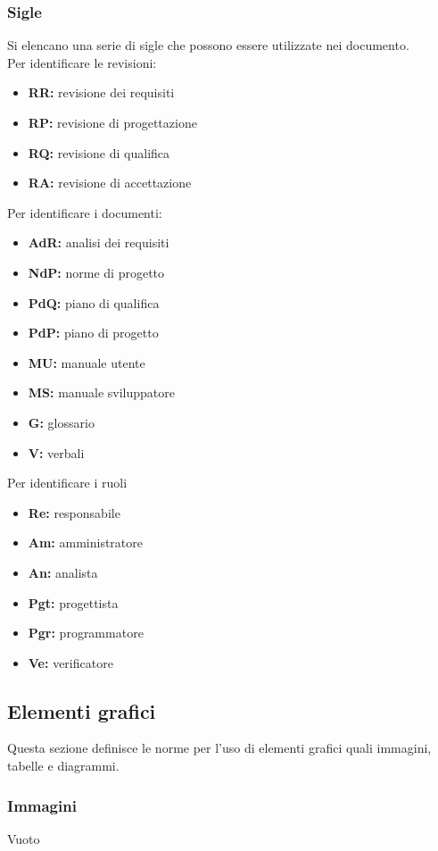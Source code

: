 \subsubsection{Sigle}
Si elencano una serie di sigle che possono essere utilizzate nei documento. 
\\
Per identificare le revisioni:
\begin{itemize}
\item \textbf{RR:} revisione dei requisiti
	\item \textbf{RP:} revisione di progettazione
	 	\item \textbf{RQ:} revisione di qualifica
			\item \textbf{RA:} revisione di accettazione
\end{itemize} 
Per identificare i documenti:
\begin{itemize}
\item \textbf{AdR:} analisi dei requisiti
	\item \textbf{NdP:} norme di progetto
		\item \textbf{PdQ:} piano di qualifica
			\item \textbf{PdP:} piano di progetto
				\item \textbf{MU:} manuale utente
					\item \textbf{MS:} manuale sviluppatore			
						\item \textbf{G:} glossario
							\item \textbf{V:} verbali
\end{itemize}
Per identificare i ruoli
\begin{itemize}
\item \textbf{Re:} responsabile
	\item \textbf{Am:} amministratore
		\item \textbf{An:} analista
			\item \textbf{Pgt:} progettista
				\item \textbf{Pgr:} programmatore
					\item \textbf{Ve:} verificatore
\end{itemize}
\subsection{Elementi grafici}
Questa sezione definisce le norme per l'uso di elementi grafici quali immagini, tabelle e diagrammi.
\subsubsection{Immagini}
{Vuoto}
